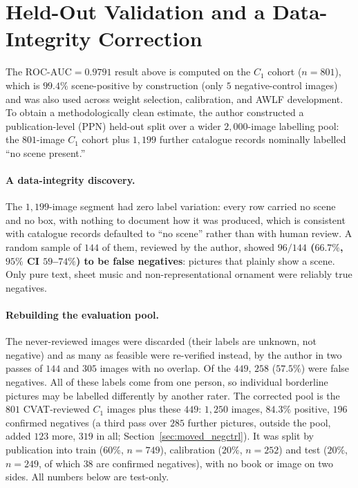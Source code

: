 \documentclass[12pt,a4paper]{report}
\begin{document}
\section{Held-Out Validation and a Data-Integrity Correction}
\label{sec:clean_holdout}
The $\text{ROC-AUC}=0.9791$ result above is computed on the $C_1$ cohort ($n=801$), which is $99.4\%$ scene-positive by construction (only $5$ negative-control images) and was also used across weight selection, calibration, and AWLF development. To obtain a methodologically clean estimate, the author constructed a publication-level (PPN) held-out split over a wider $2{,}000$-image labelling pool: the $801$-image $C_1$ cohort plus $1{,}199$ further catalogue records nominally labelled ``no scene present.''

\paragraph{A data-integrity discovery.} The $1{,}199$-image segment had zero label variation: every row carried no scene and no box, with nothing to document how it was produced, which is consistent with catalogue records defaulted to ``no scene'' rather than with human review. A random sample of $144$ of them, reviewed by the author, showed \textbf{$96/144$ ($66.7\%$, $95\%$ CI $59$--$74\%$) to be false negatives}: pictures that plainly show a scene. Only pure text, sheet music and non-representational ornament were reliably true negatives.

\paragraph{Rebuilding the evaluation pool.} The never-reviewed images were discarded (their labels are unknown, not negative) and as many as feasible were re-verified instead, by the author in two passes of $144$ and $305$ images with no overlap. Of the $449$, $258$ ($57.5\%$) were false negatives. All of these labels come from one person, so individual borderline pictures may be labelled differently by another rater. The corrected pool is the $801$ CVAT-reviewed $C_1$ images plus these $449$: $1{,}250$ images, $84.3\%$ positive, $196$ confirmed negatives (a third pass over $285$ further pictures, outside the pool, added $123$ more, $319$ in all; Section~\ref{sec:moved_negctrl}). It was split by publication into train ($60\%$, $n=749$), calibration ($20\%$, $n=252$) and test ($20\%$, $n=249$, of which $38$ are confirmed negatives), with no book or image on two sides. All numbers below are test-only.
\end{document}
